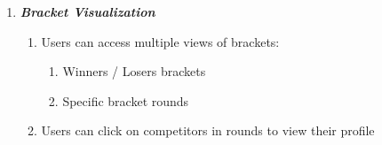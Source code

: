 \documentclass{article}
\begin{document}
\begin{enumerate}
\begin{enumerate}[label*=\arabic*.]
        \end{enumerate}

    \item \textbf{\textit{Bracket Visualization}}
        \begin{enumerate}[label*=\arabic*.]
            \item{Users can access multiple views of brackets:} \label{4.1}
            \begin{enumerate}[label*=\arabic*.]
                \item{Winners / Losers brackets}
                \item{Specific bracket rounds}
            \end{enumerate}
            \item{Users can click on competitors in rounds to view their profile}
        \end{enumerate}
    
\end{enumerate}
\end{document}
